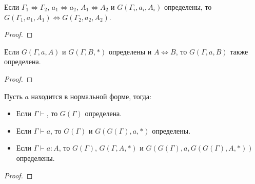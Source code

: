 \documentclass{amsart}
\theoremstyle{definition}
\theoremstyle{remark}
\newcommand{\deq}{\Leftrightarrow}
\numberwithin{figure}{section}
\begin{document}
\begin{lem}
Если $\Gamma_1 \deq \Gamma_2$, $a_1 \deq a_2$, $A_1 \deq A_2$ и $G(\Gamma_i, a_i, A_i)$ определены, то $G(\Gamma_1, a_1, A_1) \deq G(\Gamma_2, a_2, A_2)$.
\end{lem}
\begin{proof}
\end{proof}

\begin{lem}
Если $G(\Gamma, a, A)$ и $G(\Gamma, B, *)$ определены и $A \deq B$, то $G(\Gamma, a, B)$ также определена.
\end{lem}
\begin{proof}
\end{proof}

\begin{prop}
Пусть $a$ находится в нормальной форме, тогда:
\begin{itemize}
\item Если $\Gamma \vdash$, то $G(\Gamma)$ определена.
\item Если $\Gamma \vdash a$, то $G(\Gamma)$ и $G(G(\Gamma), a, *)$ определены.
\item Если $\Gamma \vdash a : A$, то $G(\Gamma)$, $G(\Gamma, A, *)$ и $G(G(\Gamma), a, G(G(\Gamma), A, *))$ определены.
\end{itemize}
\end{prop}
\begin{proof}
\end{proof}
\end{document}
